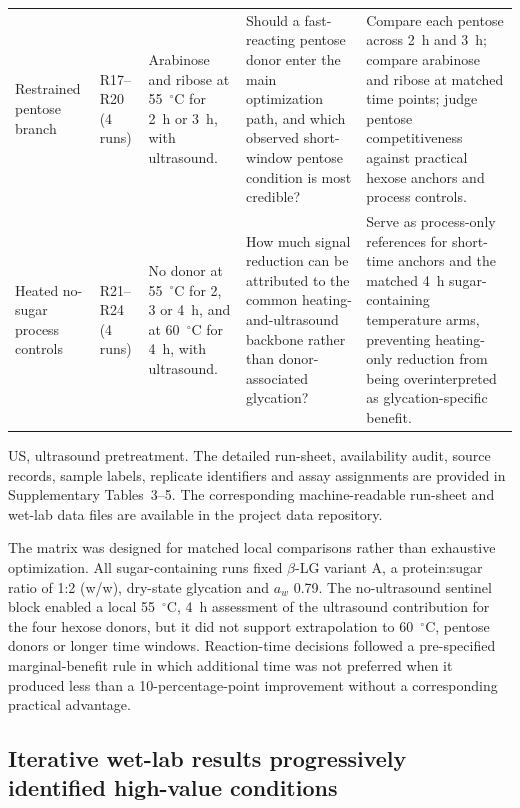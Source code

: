 \begin{table}[p]
\begin{tabular}{@{}p{}p{}p{}p{}p{}@{}}
\addlinespace
Restrained pentose branch & R17--R20 (4 runs) & Arabinose and ribose at 55~$^\circ$C for 2~h or 3~h, with ultrasound. & Should a fast-reacting pentose donor enter the main optimization path, and which observed short-window pentose condition is most credible? & Compare each pentose across 2~h and 3~h; compare arabinose and ribose at matched time points; judge pentose competitiveness against practical hexose anchors and process controls. \\
\addlinespace
Heated no-sugar process controls & R21--R24 (4 runs) & No donor at 55~$^\circ$C for 2, 3 or 4~h, and at 60~$^\circ$C for 4~h, with ultrasound. & How much signal reduction can be attributed to the common heating-and-ultrasound backbone rather than donor-associated glycation? & Serve as process-only references for short-time anchors and the matched 4~h sugar-containing temperature arms, preventing heating-only reduction from being overinterpreted as glycation-specific benefit. \\
\bottomrule
\end{tabular}
\begin{flushleft}
\footnotesize US, ultrasound pretreatment. The detailed run-sheet, availability audit, source records, sample labels, replicate identifiers and assay assignments are provided in Supplementary Tables~3--5. The corresponding machine-readable run-sheet and wet-lab data files are available in the project data repository.
\end{flushleft}
\end{table}

The matrix was designed for matched local comparisons rather than exhaustive optimization. All sugar-containing runs fixed $\beta$-LG variant A, a protein:sugar ratio of 1:2 (w/w), dry-state glycation and $a_w$ 0.79. The no-ultrasound sentinel block enabled a local 55~$^\circ$C, 4~h assessment of the ultrasound contribution for the four hexose donors, but it did not support extrapolation to 60~$^\circ$C, pentose donors or longer time windows. Reaction-time decisions followed a pre-specified marginal-benefit rule in which additional time was not preferred when it produced less than a 10-percentage-point improvement without a corresponding practical advantage.


\subsection{Iterative wet-lab results progressively identified high-value conditions}

